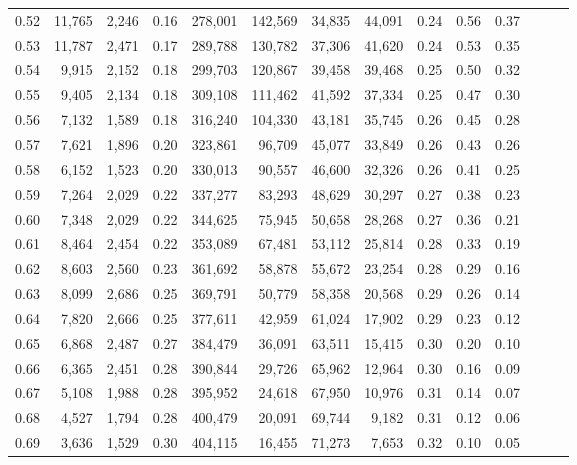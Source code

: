 \begin{tabular}{rrrrrrrrrrrrrr}
0.52 &  11,765 &  2,246 &  0.16 &  278,001 &  142,569 &  34,835 &  44,091 &  0.24 &  0.56 &      0.37 \\
0.53 &  11,787 &  2,471 &  0.17 &  289,788 &  130,782 &  37,306 &  41,620 &  0.24 &  0.53 &      0.35 \\
0.54 &   9,915 &  2,152 &  0.18 &  299,703 &  120,867 &  39,458 &  39,468 &  0.25 &  0.50 &      0.32 \\
0.55 &   9,405 &  2,134 &  0.18 &  309,108 &  111,462 &  41,592 &  37,334 &  0.25 &  0.47 &      0.30 \\
0.56 &   7,132 &  1,589 &  0.18 &  316,240 &  104,330 &  43,181 &  35,745 &  0.26 &  0.45 &      0.28 \\
0.57 &   7,621 &  1,896 &  0.20 &  323,861 &   96,709 &  45,077 &  33,849 &  0.26 &  0.43 &      0.26 \\
0.58 &   6,152 &  1,523 &  0.20 &  330,013 &   90,557 &  46,600 &  32,326 &  0.26 &  0.41 &      0.25 \\
0.59 &   7,264 &  2,029 &  0.22 &  337,277 &   83,293 &  48,629 &  30,297 &  0.27 &  0.38 &      0.23 \\
0.60 &   7,348 &  2,029 &  0.22 &  344,625 &   75,945 &  50,658 &  28,268 &  0.27 &  0.36 &      0.21 \\
0.61 &   8,464 &  2,454 &  0.22 &  353,089 &   67,481 &  53,112 &  25,814 &  0.28 &  0.33 &      0.19 \\
0.62 &   8,603 &  2,560 &  0.23 &  361,692 &   58,878 &  55,672 &  23,254 &  0.28 &  0.29 &      0.16 \\
0.63 &   8,099 &  2,686 &  0.25 &  369,791 &   50,779 &  58,358 &  20,568 &  0.29 &  0.26 &      0.14 \\
0.64 &   7,820 &  2,666 &  0.25 &  377,611 &   42,959 &  61,024 &  17,902 &  0.29 &  0.23 &      0.12 \\
0.65 &   6,868 &  2,487 &  0.27 &  384,479 &   36,091 &  63,511 &  15,415 &  0.30 &  0.20 &      0.10 \\
0.66 &   6,365 &  2,451 &  0.28 &  390,844 &   29,726 &  65,962 &  12,964 &  0.30 &  0.16 &      0.09 \\
0.67 &   5,108 &  1,988 &  0.28 &  395,952 &   24,618 &  67,950 &  10,976 &  0.31 &  0.14 &      0.07 \\
0.68 &   4,527 &  1,794 &  0.28 &  400,479 &   20,091 &  69,744 &   9,182 &  0.31 &  0.12 &      0.06 \\
0.69 &   3,636 &  1,529 &  0.30 &  404,115 &   16,455 &  71,273 &   7,653 &  0.32 &  0.10 &      0.05 \\

\end{tabular}
